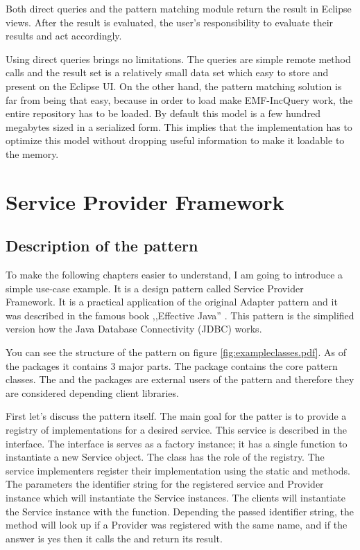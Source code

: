Both direct queries and the pattern matching module return the result in Eclipse 
views. After the result is evaluated, the user's responsibility to evaluate their
results and act accordingly.

Using direct queries brings no limitations. The queries are simple remote method
calls and the result set is a relatively small data set which easy to store and
present on the Eclipse UI. On the other hand, the pattern matching solution is
far from being that easy, because in order to load make EMF-IncQuery work, the
entire repository has to be loaded. By default this model is a few hundred
megabytes sized in a serialized form. This implies that the implementation has to 
optimize this model without dropping useful information to make it loadable to 
the memory.

\section{Service Provider Framework}\label{sect:spf}

\subsection{Description of the pattern}

To make the following chapters easier to understand, I am going to introduce a
simple use-case example. It is a design pattern called Service Provider
Framework. It is a practical application of the original Adapter pattern and it
was described in the famous book ,,Effective Java'' \cite{Bloch08}. This pattern
is the simplified version how the Java Database Connectivity (JDBC) works.


You can see the structure of the pattern on figure
\autoref{fig:exampleclasses.pdf}. As of the packages it contains 3 major parts.
The  package contains the core pattern classes. The 
and the  packages are external users of the pattern and therefore
they are considered depending client libraries.

First let's discuss the pattern itself. The main goal for the patter is to
provide a registry of implementations for a desired service. This service is
described in the  interface. The  interface is
serves as a factory instance; it has a single function to instantiate a new
Service object. The  class has the role of the registry.
The service implementers register their implementation using the static
 and  methods. The
parameters the identifier string for the registered service and Provider
instance which will instantiate the Service instances. The clients will
instantiate the Service instance with the  function.
Depending the passed identifier string, the method will look up if a Provider
was registered with the same name, and if the answer is yes then it calls the
 and return its result.

